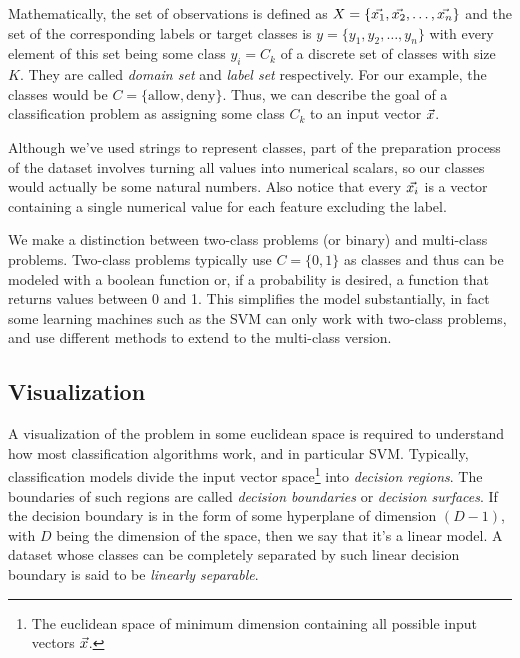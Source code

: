 Mathematically, the set of observations is defined as $X = \{\vec{x_1}, \vec{x_2}, \dots, \vec{x_n}\}$ and the set of the corresponding labels or target classes is $y = \{y_1, y_2, \dots, y_n\}$ with every element of this set being some class $y_i = C_k$ of a discrete set of classes with size $K$. They are called \emph{domain set} and \emph{label set} respectively. For our example, the classes would be $C = \{\text{allow}, \text{deny}\}$. Thus, we can describe the goal of a classification problem as assigning some class $C_k$ to an input vector $\vec{x}$.

Although we've used strings to represent classes, part of the preparation process of the dataset involves turning all values into numerical scalars, so our classes would actually be some natural numbers. Also notice that every $\vec{x_i}$ is a vector containing a single numerical value for each feature excluding the label. 

We make a distinction between two-class problems (or binary) and multi-class problems. Two-class problems typically use $C = \{0, 1\}$ as classes and thus can be modeled with a boolean function or, if a probability is desired, a function that returns values between 0 and 1. This simplifies the model substantially, in fact some learning machines such as the SVM can only work with two-class problems, and use different methods to extend to the multi-class version.

\subsection{Visualization}
\label{sec:ch4.visualization}

A visualization of the problem in some euclidean space is required to understand how most classification algorithms work, and in particular SVM. Typically, clas\-si\-fi\-cation models divide the input vector space\footnote{The euclidean space of minimum dimension containing all possible input vectors $\vec{x}$.} into \emph{decision regions}. The boundaries of such regions are called \emph{decision boundaries} or \emph{decision surfaces}. If the decision boundary is in the form of some hyperplane of dimension $(D - 1)$, with $D$ being the dimension of the space, then we say that it's a linear model. A dataset whose classes can be completely separated by such linear decision boundary is said to be \emph{linearly separable}.

